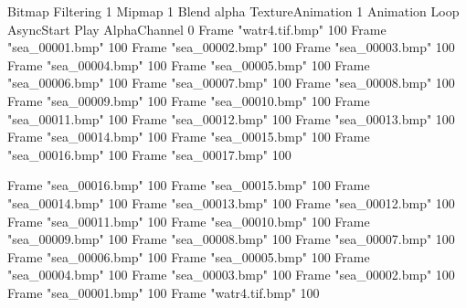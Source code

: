 {Bitmap
	{Filtering 1}
	{Mipmap 1}
	{Blend alpha}
	{TextureAnimation 1}
	{Animation Loop AsyncStart Play}
	{AlphaChannel 0}
	{Frame "watr4.tif.bmp" 100}
	{Frame "sea_00001.bmp" 100}
	{Frame "sea_00002.bmp" 100}
	{Frame "sea_00003.bmp" 100}
	{Frame "sea_00004.bmp" 100}
	{Frame "sea_00005.bmp" 100}
	{Frame "sea_00006.bmp" 100}
	{Frame "sea_00007.bmp" 100}
	{Frame "sea_00008.bmp" 100}
	{Frame "sea_00009.bmp" 100}
	{Frame "sea_00010.bmp" 100}
	{Frame "sea_00011.bmp" 100}
	{Frame "sea_00012.bmp" 100}
	{Frame "sea_00013.bmp" 100}
	{Frame "sea_00014.bmp" 100}
	{Frame "sea_00015.bmp" 100}
	{Frame "sea_00016.bmp" 100}
	{Frame "sea_00017.bmp" 100}


	{Frame "sea_00016.bmp" 100}
	{Frame "sea_00015.bmp" 100}
	{Frame "sea_00014.bmp" 100}
	{Frame "sea_00013.bmp" 100}
	{Frame "sea_00012.bmp" 100}
	{Frame "sea_00011.bmp" 100}
	{Frame "sea_00010.bmp" 100}
	{Frame "sea_00009.bmp" 100}
	{Frame "sea_00008.bmp" 100}
	{Frame "sea_00007.bmp" 100}
	{Frame "sea_00006.bmp" 100}
	{Frame "sea_00005.bmp" 100}
	{Frame "sea_00004.bmp" 100}
	{Frame "sea_00003.bmp" 100}
	{Frame "sea_00002.bmp" 100}
	{Frame "sea_00001.bmp" 100}
	{Frame "watr4.tif.bmp" 100}


}
